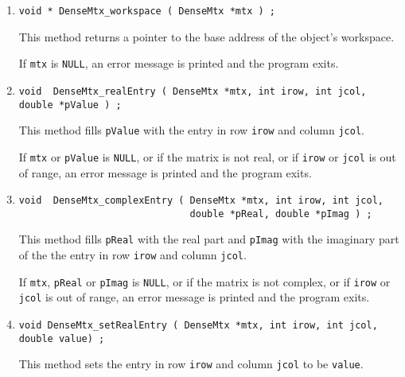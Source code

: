 \begin{enumerate}
\item
\begin{verbatim}
void * DenseMtx_workspace ( DenseMtx *mtx ) ;
\end{verbatim}
This method returns a pointer to the base address of the object's
workspace.
\par {}
If {\tt mtx} is {\tt NULL},
an error message is printed and the program exits.
\item
\begin{verbatim}
void  DenseMtx_realEntry ( DenseMtx *mtx, int irow, int jcol, double *pValue ) ;
\end{verbatim}
This method fills {\tt *pValue} with the entry 
in row {\tt irow} and column {\tt jcol}.
\par {}
If {\tt mtx} or {\tt pValue} is {\tt NULL},
or if the matrix is not real,
or if {\tt irow} or {\tt jcol} is out of range,
an error message is printed and the program exits.
\item
\begin{verbatim}
void  DenseMtx_complexEntry ( DenseMtx *mtx, int irow, int jcol,
                              double *pReal, double *pImag ) ;
\end{verbatim}
This method fills {\tt *pReal} with the real part and
{\tt *pImag} with the imaginary part of the the entry
in row {\tt irow} and column {\tt jcol}.
\par {}
If {\tt mtx}, {\tt pReal} or {\tt pImag} is {\tt NULL},
or if the matrix is not complex,
or if {\tt irow} or {\tt jcol} is out of range,
an error message is printed and the program exits.
\item
\begin{verbatim}
void DenseMtx_setRealEntry ( DenseMtx *mtx, int irow, int jcol, double value) ;
\end{verbatim}
This method sets the entry in row {\tt irow} and column {\tt jcol}
to be {\tt value}.
\par {}

\end{enumerate}
